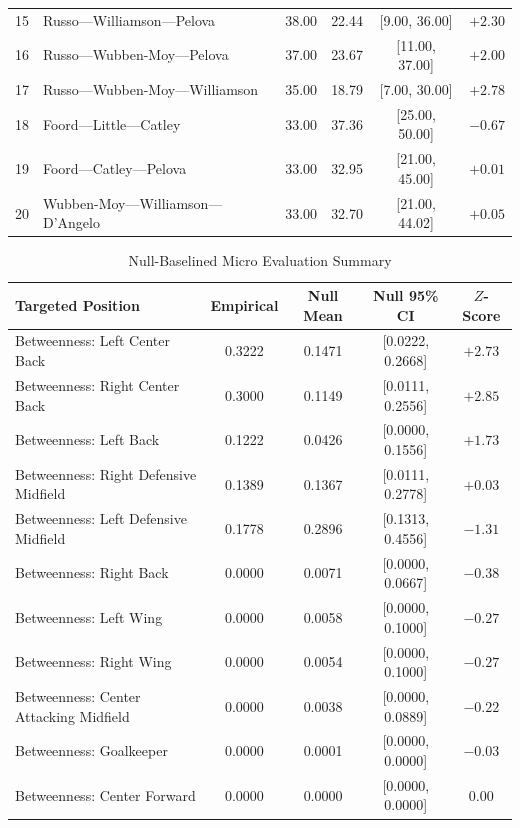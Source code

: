 \documentclass[12pt, a4paper]{article}
\begin{document}
\begin{table}[htbp]
\begin{tabularx}{\textwidth}{c X c c c c}
        15 & Russo---\allowbreak Williamson---\allowbreak Pelova      & 38.00  & 22.44 & [9.00, 36.00]  & $+2.30$ \\
        16 & Russo---\allowbreak Wubben-Moy---\allowbreak Pelova      & 37.00  & 23.67 & [11.00, 37.00] & $+2.00$ \\
        17 & Russo---\allowbreak Wubben-Moy---\allowbreak Williamson  & 35.00  & 18.79 & [7.00, 30.00]  & $+2.78$ \\
        18 & Foord---\allowbreak Little---\allowbreak Catley          & 33.00  & 37.36 & [25.00, 50.00] & $-0.67$ \\
        19 & Foord---\allowbreak Catley---\allowbreak Pelova          & 33.00  & 32.95 & [21.00, 45.00] & $+0.01$ \\
        20 & Wubben-Moy---\allowbreak Williamson---\allowbreak D’Angelo & 33.00 & 32.70 & [21.00, 44.02] & $+0.05$ \\
        \bottomrule
    \end{tabularx}
\end{table}


\begin{table}[htbp]
    \centering
    \scriptsize
    \setlength{\tabcolsep}{3pt} %
    \caption{Null-Baselined Micro Evaluation Summary}
    \label{tab:null_micro_summary}
    \begin{tabularx}{\textwidth}{X c c c c}
        \toprule
        \textbf{Targeted Position} & \textbf{Empirical} & \textbf{Null Mean} & \textbf{Null 95\% CI} & \textbf{$Z$-Score} \\
        \midrule
        Betweenness: Left Center Back & 0.3222 & 0.1471 & [0.0222, 0.2668] & $+2.73$ \\
        Betweenness: Right Center Back & 0.3000 & 0.1149 & [0.0111, 0.2556] & $+2.85$ \\
        Betweenness: Left Back & 0.1222 & 0.0426 & [0.0000, 0.1556] & $+1.73$ \\
        Betweenness: Right Defensive Midfield & 0.1389 & 0.1367 & [0.0111, 0.2778] & $+0.03$ \\
        Betweenness: Left Defensive Midfield & 0.1778 & 0.2896 & [0.1313, 0.4556] & $-1.31$ \\
        Betweenness: Right Back & 0.0000 & 0.0071 & [0.0000, 0.0667] & $-0.38$ \\
        Betweenness: Left Wing & 0.0000 & 0.0058 & [0.0000, 0.1000] & $-0.27$ \\
        Betweenness: Right Wing & 0.0000 & 0.0054 & [0.0000, 0.1000] & $-0.27$ \\
        Betweenness: Center Attacking Midfield & 0.0000 & 0.0038 & [0.0000, 0.0889] & $-0.22$ \\
        Betweenness: Goalkeeper & 0.0000 & 0.0001 & [0.0000, 0.0000] & $-0.03$ \\
        Betweenness: Center Forward & 0.0000 & 0.0000 & [0.0000, 0.0000] & $0.00$ \\
        \bottomrule
    \end{tabularx}
\end{table}
\end{document}
